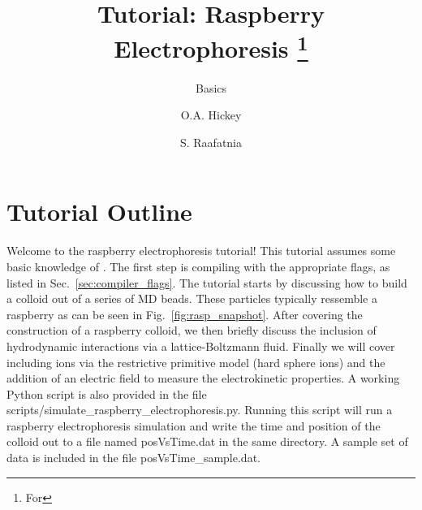 \documentclass[
paper=a4,                       %
fontsize=11pt,                  %
twoside,                        %
footsepline,                    %
headsepline,                    %
headinclude=false,              %
footinclude=false,              %
pagesize,                       %
]{scrartcl}
\begin{document}
\esptitlehead
\title{Tutorial: Raspberry Electrophoresis%
\ifdefined\esversion%
\thanks{For \es \esversion}%
\fi%
}
\subtitle{\es Basics}
\author{O.A. Hickey \and S. Raafatnia}
\maketitle


\section{Tutorial Outline}

Welcome to the raspberry electrophoresis \es{} tutorial! This tutorial assumes some basic knowledge of \es{}.
The first step is compiling \es{} with the appropriate flags, as listed in Sec.~\ref{sec:compiler_flags}.
The tutorial starts by discussing how to build a colloid out of a series of MD beads. These particles typically
ressemble a raspberry as can be seen in Fig.~\ref{fig:rasp_snapshot}. After covering the construction of a raspberry colloid, we then
briefly discuss the inclusion of hydrodynamic interactions via a lattice-Boltzmann fluid. Finally we will cover
including ions via the restrictive primitive model (hard sphere ions) and the addition of an electric field
to measure the electrokinetic properties. A working Python script is also provided in the file scripts/simulate\_raspberry\_electrophoresis.py. Running
this script will run a raspberry electrophoresis simulation and write the time and position of the colloid out to a file named posVsTime.dat in the same directory.
A sample set of data is included in the file posVsTime\_sample.dat.
\end{document}
